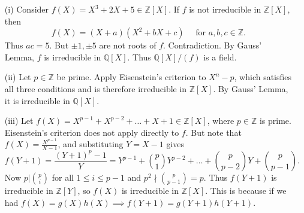 \documentclass[egregdoesnotlikesansseriftitles,a4paper]{scrartcl}
\begin{document}
\begin{example*}
       \begin{itemize}
             \item[(i)] Consider $f(X)=X^3+2X+5 \in \mathbb{Z}[X]$. If $f$ is not irreducible in $\mathbb{Z}[X]$, then \[
             f(X)= (X+a)(X^2+bX+c) \quad \text{ for } a,b,c \in \mathbb{Z}
             .\] Thus $ac=5$. But $\pm 1 , \pm 5$ are not roots of $f$. Contradiction. By Gauss' Lemma, $f$ is irreducible in $\mathbb{Q}[X]$. Thus $\mathbb{Q}[X]/(f)$ is a field.
             \item[(ii)] Let $p \in \mathbb{Z}$ be prime. Apply Eisenstein's criterion to $X^{n}-p$, which satisfies all three conditions and is therefore irreducible in $\mathbb{Z}[X]$. By Gauss' Lemma, it is irreducible in $\mathbb{Q}[X]$. 
             \item[(iii)] Let $f (X)=X^{p-1}+X^{p-2}+\ldots+X+1 \in \mathbb{Z}[X]$, where $p \in \mathbb{Z}$ is prime. Eisenstein's criterion does not apply directly to $f$. But note that $f(X)= \frac{X^{p-1}}{X-1}$, and substituting $Y=X-1$ gives \[
             f(Y+1)= \frac{(Y+1)^{p}-1}{Y}= Y^{p-1}+ {p \choose 1}Y^{p-2}+\ldots+ {p \choose p-2}Y+ {p \choose p-1}
             .\] Now $p| {p \choose i}$ for all $1 \leq i \leq p-1$ and $p^2 \nmid {p \choose p-1}=p$. Thus $f (Y+1)$ is irreducible in $\mathbb{Z}[Y]$, so $f (X)$ is irreducible in $\mathbb{Z}[X]$. This is because if we had $f (X)=g (X) h (X) \implies f (Y+1)=g (Y+1)h (Y+1)$.
       \end{itemize}
\end{example*}
\newpage
\end{document}
